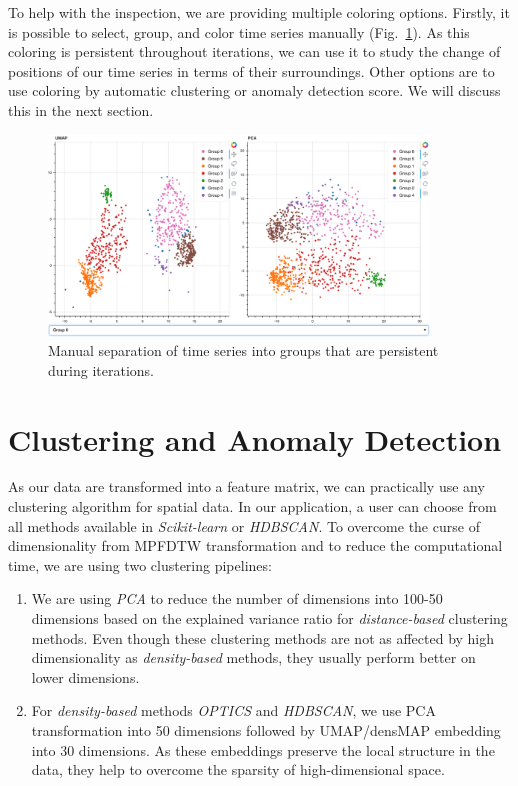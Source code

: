 To help with the inspection, we are providing multiple coloring options. Firstly, it is possible to select, group, and color time series manually (Fig.~\ref{fig:coloring}). As this coloring is persistent throughout iterations, we can use it to study the change of positions of our time series in terms of their surroundings. Other options are to use coloring by automatic clustering or anomaly detection score. We will discuss this in the next section.
\begin{figure}[htp]
    \centering
    \includegraphics[width=0.9\textwidth]{img/overview.png}
    \caption{Manual separation of time series into groups that are persistent during iterations.}
    \label{fig:coloring}
\end{figure}

\section{Clustering and Anomaly Detection}
As our data are transformed into a feature matrix, we can practically use any clustering algorithm for spatial data. In our application, a user can choose from all methods available in \textit{Scikit-learn} or \textit{HDBSCAN}. To overcome the curse of dimensionality from MPFDTW transformation and to reduce the computational time, we are using two clustering pipelines:
\begin{enumerate}
    \item We are using \textit{PCA} to reduce the number of dimensions into 100-50 dimensions based on the explained variance ratio for \textit{distance-based} clustering methods. Even though these clustering methods are not as affected by high dimensionality as \textit{density-based} methods, they usually perform better on lower dimensions.
    \item For \textit{density-based} methods \textit{OPTICS} and \textit{HDBSCAN}, we use PCA transformation into 50 dimensions followed by UMAP/densMAP embedding into 30 dimensions. As these embeddings preserve the local structure in the data, they help to overcome the sparsity of high-dimensional space.
\end{enumerate}

